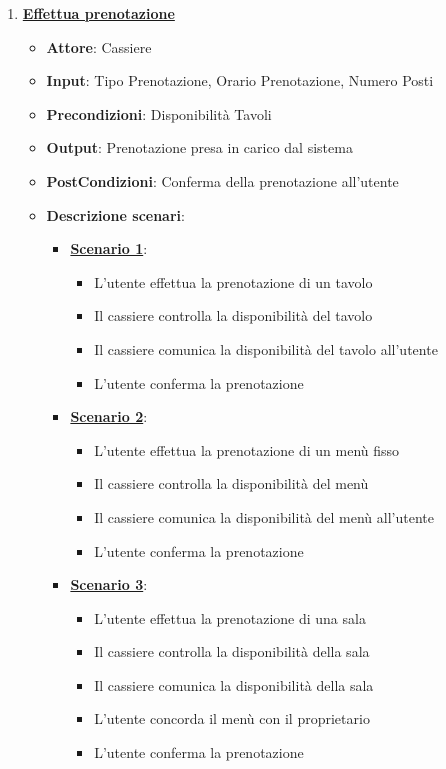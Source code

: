 \begin{enumerate}
    \item \uline {{\bf Effettua prenotazione}}
    \begin{itemize}
        \item {\bf Attore}: Cassiere
        \item {\bf Input}: Tipo Prenotazione, Orario Prenotazione, Numero Posti
        \item {\bf Precondizioni}: Disponibilit\`a Tavoli
        \item {\bf Output}: Prenotazione presa in carico dal sistema
        \item {\bf PostCondizioni}: Conferma della prenotazione all'utente
        \item {\bf Descrizione scenari}:
        \begin{itemize}
            \item \uline{{\bf Scenario 1}}:
            \begin{itemize}
                \item L'utente effettua la prenotazione di un tavolo
                \item Il cassiere controlla la disponibilit\`a del tavolo
                \item Il cassiere comunica la disponibilit\`a del tavolo all'utente
                \item L'utente conferma la prenotazione
            \end{itemize}
            \item \uline{{\bf Scenario 2}}:
            \begin{itemize}
                \item L'utente effettua la prenotazione di un men\`u fisso
                \item Il cassiere controlla la disponibilit\`a del men\`u
                \item Il cassiere comunica la disponibilit\`a del men\`u all'utente
                \item L'utente conferma la prenotazione
            \end{itemize}
            \item \uline{{\bf Scenario 3}}:
            \begin{itemize}
                \item L'utente effettua la prenotazione di una sala
                \item Il cassiere controlla la disponibilit\`a della sala
                \item Il cassiere comunica la disponibilit\`a della sala
                \item L'utente concorda il men\`u con il proprietario
                \item L'utente conferma la prenotazione
            \end{itemize}
        \end{itemize}
    \end{itemize}


\end{enumerate}
